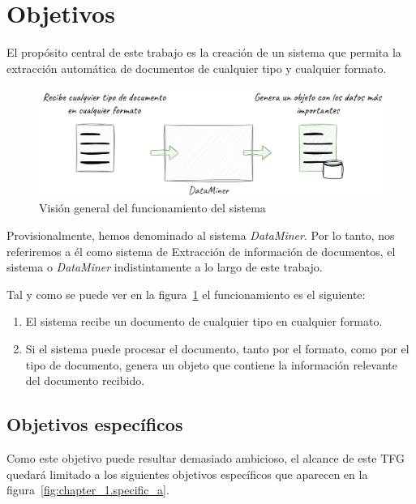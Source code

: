 \section{Objetivos}

El propósito central de este trabajo es la creación de un sistema que permita la extracción automática de documentos
de cualquier tipo y cualquier formato.

\begin{figure}[ht]
    \begin{center}
        \includegraphics[width=\textwidth]{./chapter/1/images/chapter_1.overview}
        \caption{Visión general del funcionamiento del sistema}
        \label{fig:chapter_1.overview}
    \end{center}
\end{figure}

Provisionalmente, hemos denominado al sistema \textit{DataMiner}.
Por lo tanto, nos referiremos a él como sistema de Extracción de información de documentos, el sistema o
\textit{DataMiner} indistintamente a lo largo de este trabajo.

Tal y como se puede ver en la figura~\ref{fig:chapter_1.overview} el funcionamiento es el siguiente:

\begin{enumerate}
    \item El sistema recibe un documento de cualquier tipo en cualquier formato.
    \item
    Si el sistema puede procesar el documento, tanto por el formato, como por el tipo de documento, genera un objeto que
    contiene la información relevante del documento recibido.
\end{enumerate}

\subsection{Objetivos específicos}

Como este objetivo puede resultar demasiado ambicioso, el alcance de este TFG quedará limitado a los siguientes
objetivos específicos que aparecen en la figura~\ref{fig:chapter_1.specific_a}.

